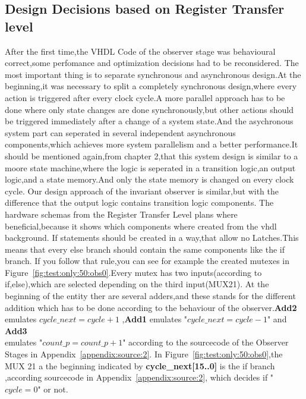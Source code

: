 \subsection{Design Decisions based on Register Transfer level}

After the first time,the VHDL Code of the observer stage was behavioural correct,some perfomance and optimization decisions had to be reconsidered.
The most important thing is to separate synchronous and asynchronous design.At the beginning,it was necessary to split a completely synchronous design,where
every action is triggered after every clock cycle.A more parallel approach has to be done where only state changes are done synchronously,but other actions should
be triggered immediately after a change of a system state.And the asychronous system part can seperated in several independent asynchronous components,which achieves more 
system parallelism and a better performance.It should be mentioned again,from chapter 2,that this system design is similar to a moore state machine,where the logic 
is seperated in a transition logic,an output logic,and a state memory.And only the state memory is changed on every clock cycle.\newline
Our design approach of the invariant observer is similar,but with the difference that the output logic contains transition logic components.
The hardware schemas from the Register Transfer Level plans where beneficial,because it shows which components where created from the vhdl background.
If statements should be created in a way,that allow no Latches.This means that every else branch should contain the same components like the if branch.
If you follow that rule,you can see for example the created mutexes in Figure~\ref{fig:test:only:50:obs0}.Every mutex has two inputs(according to if,else),which are
selected depending on the third input(MUX21).\newline
At the beginning of the entity ther are several adders,and these stands for the different addition 
which has to be done according to the behaviour of the observer.\textbf{Add2} emulates $cycle\_next=cycle+1$ ,\textbf{Add1} emulates "$cycle\_next=cycle-1$" and \textbf{Add3}\\ 
emulates "$count\_p=count\_p+1$" according to the sourcecode of the Observer Stages in Appendix~\ref{appendix:source:2}.
In Figure~\ref{fig:test:only:50:obs0},the MUX 21 a the beginning indicated by \textbf{cycle\_next[15..0]} is the if branch ,according sourcecode in Appendix~\ref{appendix:source:2},
which decides if "$cycle=0$" or not. \newline

